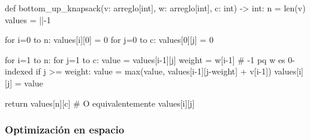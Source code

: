 
\begin{pseudocode}
def bottom_up_knapsack(v: arreglo[int], w: arreglo[int], c: int) -> int:
    n = len(v)
    values = ||-1

    for i=0 to n:
        values[i][0] = 0
    for j=0 to c:
        values[0][j] = 0

    for i=1 to n:
        for j=1 to c:
            value = values[i-1][j]
            weight = w[i-1]  # -1 pq w es 0-indexed 
            if j >= weight:
                value = max(value, values[i-1][j-weight] + v[i-1])
            values[i][j] = value

    return values[n][c]  # O equivalentemente values[i][j]
\end{pseudocode}


\subsubsection{Optimización en espacio}






    
